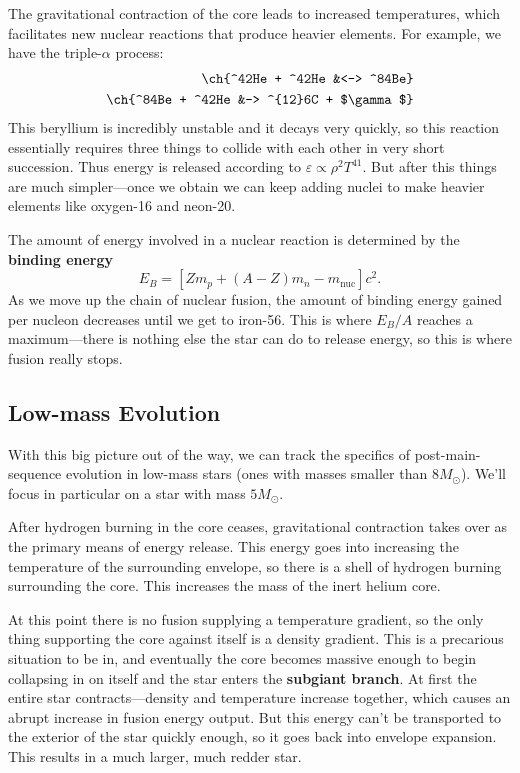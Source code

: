\documentclass[../a062main.tex]{subfiles}
\begin{document}
The gravitational contraction of the core leads to increased temperatures, which facilitates new nuclear reactions that produce heavier elements.
For example, we have the triple-$\alpha$ process:
\begin{align*}
    \ch{^42He + ^42He &<-> ^84Be} \\
    \ch{^84Be + ^42He &-> ^{12}6C + $\gamma$}
\end{align*}
This beryllium is incredibly unstable and it decays very quickly, so this reaction essentially requires three things to collide with each other in very short succession.
Thus energy is released according to $\varepsilon \propto \rho^2 T^{41}$.
But after this things are much simpler---once we obtain  we can keep adding  nuclei to make heavier elements like oxygen-16 and neon-20.

The amount of energy involved in a nuclear reaction is determined by the \textbf{binding energy}
\[ E_B = [Zm_p + (A - Z)m_n - m_\text{nuc}]c^2. \]
As we move up the chain of nuclear fusion, the amount of binding energy gained per nucleon decreases until we get to iron-56.
This is where $E_B / A$ reaches a maximum---there is nothing else the star can do to release energy, so this is where fusion really stops.

\subsection*{Low-mass Evolution}
With this big picture out of the way, we can track the specifics of post-main-sequence evolution in low-mass stars (ones with masses smaller than $8M_\odot$).
We'll focus in particular on a star with mass $5M_\odot$.

After hydrogen burning in the core ceases, gravitational contraction takes over as the primary means of energy release.
This energy goes into increasing the temperature of the surrounding envelope, so there is a shell of hydrogen burning surrounding the core.
This increases the mass of the inert helium core.

At this point there is no fusion supplying a temperature gradient, so the only thing supporting the core against itself is a density gradient.
This is a precarious situation to be in, and eventually the core becomes massive enough to begin collapsing in on itself and the star enters the \textbf{subgiant branch}.
At first the entire star contracts---density and temperature increase together, which causes an abrupt increase in fusion energy output.
But this energy can't be transported to the exterior of the star quickly enough, so it goes back into envelope expansion.
This results in a much larger, much redder star.
\end{document}
